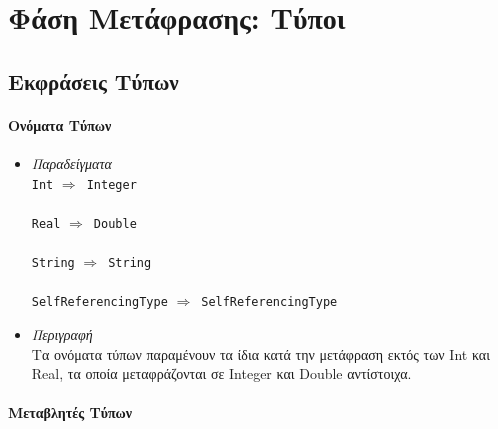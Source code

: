 \documentclass[diploma]{softlab-thesis}
\def\lra{$\Longrightarrow$\ }
\begin{document}
\section{Φάση Μετάφρασης: Τύποι}

\subsection{Εκφράσεις Τύπων}

\paragraph{Ονόματα Τύπων}

\begin{itemize}
\item
\textit{Παραδείγματα}\\

\verb|Int| \lra \verb|Integer|\\\\
\verb|Real| \lra \verb|Double|\\\\
\verb|String| \lra \verb|String|\\\\
\verb|SelfReferencingType| \lra \verb|SelfReferencingType|\\
\item
\textit{Περιγραφή}\\

Τα ονόματα τύπων παραμένουν τα ίδια κατά την μετάφραση εκτός των Int και Real,
τα οποία μεταφράζονται σε Integer και Double αντίστοιχα.

\end{itemize}

\paragraph{Μεταβλητές Τύπων}
\end{document}
